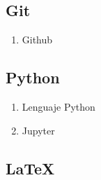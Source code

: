 \documentclass[11pt]{article}
\begin{document}
\subsection{Git}
\label{sec:org600acc4}
\begin{enumerate}
\item Github
\label{sec:orga3b6696}
\end{enumerate}
\subsection{Python}
\label{sec:orgfe3c51b}
\begin{enumerate}
\item Lenguaje Python
\label{sec:orga36f304}
\item Jupyter
\label{sec:org8f1ebd1}
\end{enumerate}
\subsection{\LaTeX{}}
\label{sec:org2fa556f}
\end{document}

